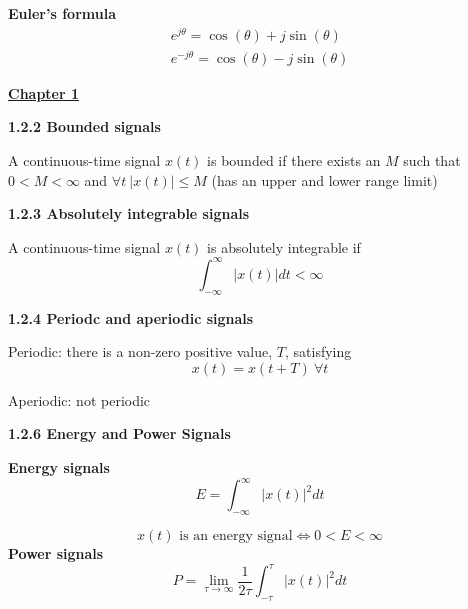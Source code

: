 \documentclass[landscape,a4paper]{extarticle}
\begin{document}
\fontsize{7}{9}\selectfont
{}\selectfont
\begin{multicols*}{5}
    \textbf{Euler's formula}
    \begin{align*}
        e^{j\theta}=\cos(\theta) + j\sin(\theta)\\
        e^{-j\theta}=\cos(\theta)-j\sin(\theta)
    \end{align*}

    \textbf{\uline{Chapter 1}}

    \textbf{1.2.2 Bounded signals}

    A continuous-time signal $x(t)$ is bounded if there exists an $M$ such that $0 < M < \infty$ and $\forall t \ |x(t)| \leq M$ (has an upper and lower range limit)

    \textbf{1.2.3 Absolutely integrable signals}

    A continuous-time signal $x(t)$ is absolutely integrable if 
    \[
        \int_{-\infty}^{\infty}|x(t)| dt < \infty
    \]

    \textbf{1.2.4 Periodc and aperiodic signals}

    Periodic: there is a non-zero positive value, $T$, satisfying 
    \[
        x(t)=x(t+T) \ \forall t \tag{1.1}
    \]

    Aperiodic: not periodic

    \textbf{1.2.6 Energy and Power Signals}

    \textbf{Energy signals}
    \[
        E = \int_{-\infty}^{\infty}|x(t)|^2 dt \tag{1.3a}
    \]
    
    \[
        x(t) \text{ is an energy signal} \iff 0 < E < \infty \tag{1.3b}
    \]
    \textbf{Power signals}
    \[
        P = \lim_{\tau \to \infty}\frac{1}{2\tau}\int_{-\tau}^{\tau}|x(t)|^2dt \tag{1.4a}
    \]


\end{multicols*}
\end{document}
